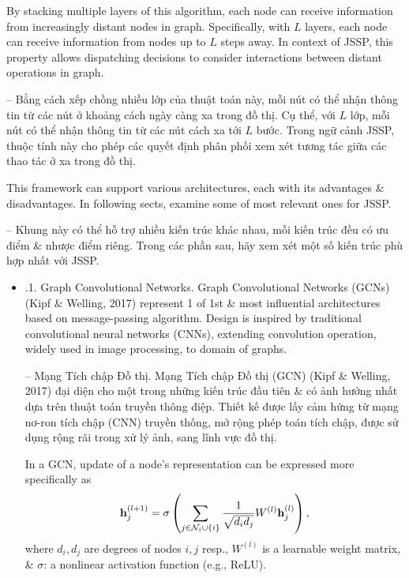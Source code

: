 \documentclass{article}
\begin{document}
\begin{itemize}
\begin{itemize}
        By stacking multiple layers of this algorithm, each node can receive information from increasingly distant nodes in graph. Specifically, with $L$ layers, each node can receive information from nodes up to $L$ steps away. In context of JSSP, this property allows dispatching decisions to consider interactions between distant operations in graph.

        -- Bằng cách xếp chồng nhiều lớp của thuật toán này, mỗi nút có thể nhận thông tin từ các nút ở khoảng cách ngày càng xa trong đồ thị. Cụ thể, với $L$ lớp, mỗi nút có thể nhận thông tin từ các nút cách xa tới $L$ bước. Trong ngữ cảnh JSSP, thuộc tính này cho phép các quyết định phân phối xem xét tương tác giữa các thao tác ở xa trong đồ thị.

        This framework can support various architectures, each with its advantages \& disadvantages. In following sects, examine some of most relevant ones for JSSP.

        -- Khung này có thể hỗ trợ nhiều kiến trúc khác nhau, mỗi kiến trúc đều có ưu điểm \& nhược điểm riêng. Trong các phần sau, hãy xem xét một số kiến trúc phù hợp nhất với JSSP.
        \begin{itemize}
            \item {.1. Graph Convolutional Networks.} Graph Convolutional Networks (GCNs) (Kipf \& Welling, 2017) represent 1 of 1st \& most influential architectures based on message-passing algorithm. Design is inspired by traditional convolutional neural networks (CNNs), extending convolution operation, widely used in image processing, to domain of graphs.

            -- {\sf Mạng Tích chập Đồ thị.} Mạng Tích chập Đồ thị (GCN) (Kipf \& Welling, 2017) đại diện cho một trong những kiến trúc đầu tiên \& có ảnh hưởng nhất dựa trên thuật toán truyền thông điệp. Thiết kế được lấy cảm hứng từ mạng nơ-ron tích chập (CNN) truyền thống, mở rộng phép toán tích chập, được sử dụng rộng rãi trong xử lý ảnh, sang lĩnh vực đồ thị.

            In a GCN, update of a node's representation can be expressed more specifically as
            \begin{equation*}
                {\bf h}_j^{(l + 1)} = \sigma\left(\sum_{j\in{\cal N}_i\cup\{i\}} \frac{1}{\sqrt{d_id_j}}W^{(l)}{\bf h}_j^{(l)} \right),
            \end{equation*}
            where $d_i,d_j$ are degrees of nodes $i,j$ resp., $W^{(l)}$ is a learnable weight matrix, \& $\sigma$: a nonlinear activation function (e.g., ReLU).


\end{itemize}
\end{itemize}
\end{itemize}
\end{document}
